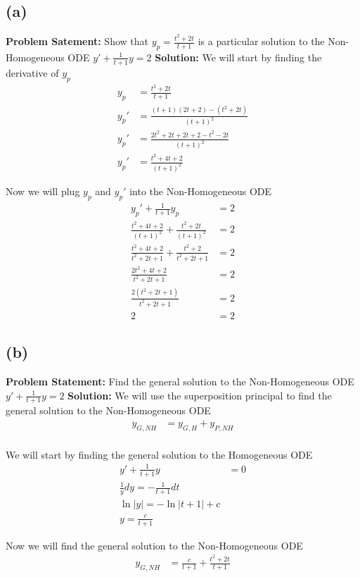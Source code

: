 \documentclass[12pt, letterpaper]{article}
\begin{document}
\subsection*{(a)}
\textbf{Problem Satement:} Show that $y_p = \frac{t^2 + 2t}{t+1}$ is a particular solution to the Non-Homogeneous ODE $y' + \frac{1}{t+1}y = 2$
\textbf{Solution:} We will start by finding the derivative of $y_p$
\begin{align*}
y_p &= \frac{t^2 + 2t}{t+1} \\
y_p' &= \frac{(t+1)(2t+2) - (t^2 + 2t)}{(t+1)^2} \\
y_p' &= \frac{2t^2 + 2t + 2t + 2 - t^2 - 2t}{(t+1)^2} \\
y_p' &= \frac{t^2 + 4t + 2}{(t+1)^2}
\end{align*}

Now we will plug $y_p$ and $y_p'$ into the Non-Homogeneous ODE
\begin{align*}
y_p' + \frac{1}{t+1}y_p &= 2 \\
\frac{t^2 + 4t + 2}{(t+1)^2} + \frac{t^2 + 2t}{(t+1)^2} &= 2 \\
\frac{t^2 + 4t + 2 }{t^2 + 2t + 1} + \frac{t^2+2}{t^2 + 2t + 1} &= 2 \\
\frac{2t^2 + 4t + 2}{t^2 + 2t + 1} &= 2 \\
\frac{2(t^2 + 2t + 1)}{t^2 + 2t + 1} &= 2 \\
2 &= 2
\end{align*}

\subsection*{(b)}
\textbf{Problem Statement:} Find the general solution to the Non-Homogeneous ODE $y' + \frac{1}{t+1}y = 2$
\textbf{Solution:} We will use the superposition principal to find the general solution to the Non-Homogeneous ODE
\begin{align*}
y_{G,NH} &= y_{G,H} + y_{P,NH} \\
\end{align*}

We will start by finding the general solution to the Homogeneous ODE
\begin{align*}
y' + \frac{1}{t+1}y &= 0 \\
\frac{1}{y}dy = -\frac{1}{t+1}dt \\
\ln|y| = -\ln|t+1| + c \\
y = \frac{c}{t+1}
\end{align*}

Now we will find the general solution to the Non-Homogeneous ODE
\begin{align*}
y_{G,NH} &= \frac{c}{t+1} + \frac{t^2 + 2t}{t+1} \\
\end{align*}
\end{document}
